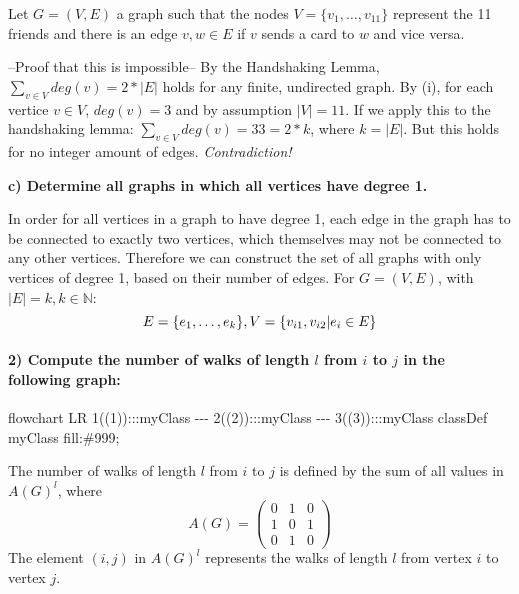 \documentclass[
]{article}
\newenvironment{Shaded}{}{}
\newcommand{\NormalTok}[1]{#1}
\begin{document}
Let \(G=(V,E)\) a graph such that the nodes
\(V = \{v_1, \dots, v_{11}\}\) represent the 11 friends and there is an
edge \(v,w \in E\) if \(v\) sends a card to \(w\) and vice versa.

--Proof that this is impossible-- By the Handshaking Lemma,
\(\sum_{v \in V} deg(v) = 2*|E|\) holds for any finite, undirected
graph. By (i), for each vertice \(v \in V\), \(deg(v) = 3\) and by
assumption \(|V| = 11\). If we apply this to the handshaking lemma:
\(\sum_{v \in V} deg(v) = 33 = 2* k\), where \(k = |E|\). But this holds
for no integer amount of edges. \emph{Contradiction!}

\textbf{c) Determine all graphs in which all vertices have degree 1.}

In order for all vertices in a graph to have degree 1, each edge in the
graph has to be connected to exactly two vertices, which themselves may
not be connected to any other vertices. Therefore we can construct the
set of all graphs with only vertices of degree 1, based on their number
of edges. For \(G = (V,E)\), with \(|E| = k, k \in \mathbb{N}\): \[
E = \{e_1, \dots , e_k\},\\
V = \{v_{i1}, v_{i2} | e_i \in E\}
\]

\hypertarget{compute-the-number-of-walks-of-length-l-from-i-to-j-in-the-following-graph}{%
\paragraph{\texorpdfstring{2) Compute the number of walks of length
\(l\) from \(i\) to \(j\) in the following
graph:}{2) Compute the number of walks of length l from i to j in the following graph:}}\label{compute-the-number-of-walks-of-length-l-from-i-to-j-in-the-following-graph}}

\begin{Shaded}
\begin{Highlighting}[]
\NormalTok{flowchart LR}
\NormalTok{    1((1)):::myClass {-}{-}{-} 2((2)):::myClass {-}{-}{-} 3((3)):::myClass}
\NormalTok{    classDef myClass fill:\#999; }
\end{Highlighting}
\end{Shaded}

The number of walks of length \(l\) from \(i\) to \(j\) is defined by
the sum of all values in \(A(G)^l\), where \[A(G) = \begin{pmatrix}
0 & 1 & 0\\
1 & 0 & 1\\
0 & 1 & 0
\end{pmatrix}\] The element \((i,j)\) in \(A(G)^l\) represents the walks
of length \(l\) from vertex \(i\) to vertex \(j\).
\end{document}
